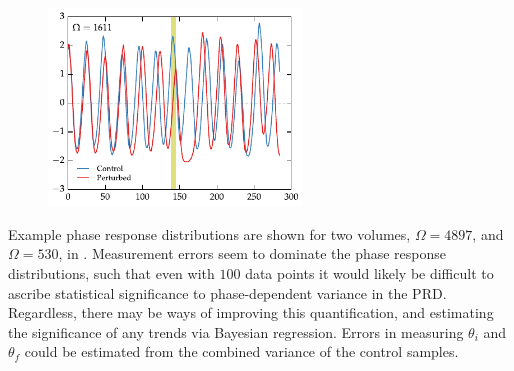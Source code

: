 \begin{figure}[tbp]
  \centering
  \includegraphics[width=0.6\textwidth]{chap7/figures/ts_example.pdf}
  \label{fig:examplets}
\end{figure}

Example phase response distributions are shown for two volumes, $\Omega = 4897$, and $\Omega = 530$, in .
Measurement errors seem to dominate the phase response distributions, such that even with $100$ data points it would likely be difficult to ascribe statistical significance to phase-dependent variance in the PRD.
Regardless, there may be ways of improving this quantification, and estimating the significance of any trends via Bayesian regression.
Errors in measuring $\theta_i$ and $\theta_f$ could be estimated from the combined variance of the control samples.

